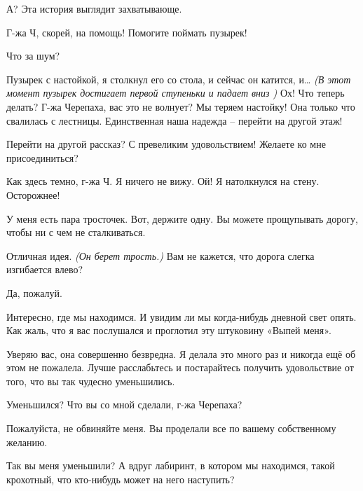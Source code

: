 \documentclass[../main.tex]{subfiles}
\begin{document}
\begin{Dialogue}
\begin{sublevel}
\begin{sublevel}

 А? Эта история выглядит захватывающе.

 Г-жа Ч, скорей, на помощь! Помогите поймать пузырек!

 Что за шум?

 Пузырек с настойкой, я столкнул его со стола, и сейчас он катится, и\ldots{} \emph{(В этот момент пузырек достигает первой ступеньки и падает вниз )} Ох! Что теперь делать? Г-жа Черепаха, вас это не волнует? Мы теряем настойку! Она только что свалилась с лестницы. Единственная наша надежда \--- перейти на другой этаж!

 Перейти на другой рассказ? С превеликим удовольствием! Желаете ко мне присоединиться?



\begin{sublevel}


 Как здесь темно, г-жа Ч\@. Я ничего не вижу. Ой! Я натолкнулся на стену. Осторожнее!

 У меня есть пара тросточек. Вот, держите одну. Вы можете прощупывать дорогу, чтобы ни с чем не сталкиваться.

 Отличная идея. \emph{(Он берет трость.)} Вам не кажется, что дорога слегка изгибается влево?

 Да, пожалуй.

 Интересно, где мы находимся. И увидим ли мы когда-нибудь дневной свет опять. Как жаль, что я вас послушался и проглотил эту штуковину «Выпей меня».

 Уверяю вас, она совершенно безвредна. Я делала это много раз и никогда ещё об этом не пожалела. Лучше расслабьтесь и постарайтесь получить удовольствие от того, что вы так чудесно уменьшились.

 Уменьшился? Что вы со мной сделали, г-жа Черепаха?

 Пожалуйста, не обвиняйте меня. Вы проделали все по вашему собственному желанию.

 Так вы меня уменьшили? А вдруг лабиринт, в котором мы находимся, такой крохотный, что кто-нибудь может на него наступить?


\end{sublevel}
\end{sublevel}
\end{sublevel}
\end{Dialogue}
\end{document}
